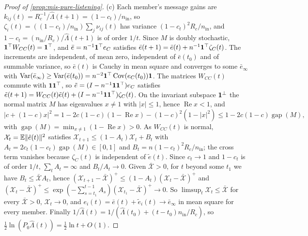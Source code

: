 \begin{proof}[Proof of \cref{prop:mis-pure-listening}]
(c) Each member's message gains are $k_{ij}(t)=R_c^{-1}/\hat\Lambda(t+1)=(1-c_t)/n_{\mathrm{in}}$, so $\zeta_i(t)=((1-c_t)/n_{\mathrm{in}})\sum_j\nu_{ij}(t)$ has variance $(1-c_t)^2R_c/n_{\mathrm{in}}$, and $1-c_t=(n_{\mathrm{in}}/R_c)/\hat\Lambda(t+1)$ is of order $1/t$. Since $M$ is doubly stochastic, $\mathbf{1}^\top W_{CC}(t)=\mathbf{1}^\top$, and $\bar e=n^{-1}\mathbf{1}^\top e_C$ satisfies $\bar e(t+1)=\bar e(t)+n^{-1}\mathbf{1}^\top\zeta_C(t)$. The increments are independent, of mean zero, independent of $\bar e(t_0)$ and of summable variance, so $\bar e(t)$ is Cauchy in mean square and converges to some $\bar e_\infty$ with $\operatorname{Var}(\bar e_\infty)\ge\operatorname{Var}(\bar e(t_0))=n^{-2}\mathbf{1}^\top\operatorname{Cov}(e_C(t_0))\mathbf{1}$. The matrices $W_{CC}(t)$ commute with $\mathbf{1}\mathbf{1}^\top$, so $\tilde e=(I-n^{-1}\mathbf{1}\mathbf{1}^\top)e_C$ satisfies $\tilde e(t+1)=W_{CC}(t)\tilde e(t)+(I-n^{-1}\mathbf{1}\mathbf{1}^\top)\zeta_C(t)$. On the invariant subspace $\mathbf{1}^\perp$ the normal matrix $M$ has eigenvalues $x\neq1$ with $\lvert x\rvert\le1$, hence $\operatorname{Re}x<1$, and
\begin{equation*}
\lvert c+(1-c)x\rvert^2=1-2c(1-c)(1-\operatorname{Re}x)-(1-c)^2(1-\lvert x\rvert^2)\le1-2c(1-c)\operatorname{gap}(M),
\end{equation*}
with $\operatorname{gap}(M)=\min_{x\neq1}(1-\operatorname{Re}x)>0$. As $W_{CC}(t)$ is normal, $\mathcal X_t=\mathbb{E}\lVert\tilde e(t)\rVert^2$ satisfies $\mathcal X_{t+1}\le(1-A_t)\mathcal X_t+B_t$ with $A_t=2c_t(1-c_t)\operatorname{gap}(M)\in[0,1]$ and $B_t=n(1-c_t)^2R_c/n_{\mathrm{in}}$; the cross term vanishes because $\zeta_C(t)$ is independent of $\tilde e(t)$. Since $c_t\to1$ and $1-c_t$ is of order $1/t$, $\sum_tA_t=\infty$ and $B_t/A_t\to0$. Given $\bar{\mathcal X}>0$, for $t$ beyond some $t_1$ we have $B_t\le\bar{\mathcal X}A_t$, hence $(\mathcal X_{t+1}-\bar{\mathcal X})^+\le(1-A_t)(\mathcal X_t-\bar{\mathcal X})^+$ and $(\mathcal X_t-\bar{\mathcal X})^+\le\exp(-\sum_{s=t_1}^{t-1}A_s)(\mathcal X_{t_1}-\bar{\mathcal X})^+\to0$. So $\limsup_t\mathcal X_t\le\bar{\mathcal X}$ for every $\bar{\mathcal X}>0$, $\mathcal X_t\to0$, and $e_i(t)=\bar e(t)+\tilde e_i(t)\to\bar e_\infty$ in mean square for every member. Finally $1/\hat\Lambda(t)=1/(\hat\Lambda(t_0)+(t-t_0)n_{\mathrm{in}}/R_c)$, so $\tfrac12\ln(P_0\hat\Lambda(t))=\tfrac12\ln t+O(1)$.
\end{proof}

